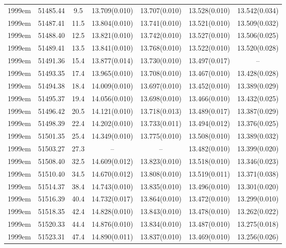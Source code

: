 \begin{table*}
\begin{tabular}{ccccccc}
1999em	  & 51485.44	 & 9.5	& 13.709(0.010)	 & 13.707(0.010)	 & 13.528(0.010)	 & 13.542(0.034) \\ 
1999em	  & 51487.41	 & 11.5	& 13.804(0.010)	 & 13.741(0.010)	 & 13.521(0.010)	 & 13.509(0.032) \\ 
1999em	  & 51488.40	 & 12.5	& 13.821(0.010)	 & 13.742(0.010)	 & 13.527(0.010)	 & 13.506(0.025) \\ 
1999em	  & 51489.41	 & 13.5	& 13.841(0.010)	 & 13.768(0.010)	 & 13.522(0.010)	 & 13.520(0.028) \\ 
1999em	  & 51491.36	 & 15.4	& 13.877(0.014)	 & 13.730(0.010)	 & 13.497(0.017)	 & -- \\ 
1999em	  & 51493.35	 & 17.4	& 13.965(0.010)	 & 13.708(0.010)	 & 13.467(0.010)	 & 13.428(0.028) \\ 
1999em	  & 51494.38	 & 18.4	& 14.009(0.010)	 & 13.697(0.010)	 & 13.452(0.010)	 & 13.389(0.029) \\ 
1999em	  & 51495.37	 & 19.4	& 14.056(0.010)	 & 13.698(0.010)	 & 13.466(0.010)	 & 13.432(0.025) \\ 
1999em	  & 51496.42	 & 20.5	& 14.121(0.010)	 & 13.718(0.013)	 & 13.489(0.017)	 & 13.387(0.029) \\ 
1999em	  & 51498.39	 & 22.4	& 14.202(0.010)	 & 13.733(0.011)	 & 13.494(0.012)	 & 13.376(0.025) \\ 
1999em	  & 51501.35	 & 25.4	& 14.349(0.010)	 & 13.775(0.010)	 & 13.508(0.010)	 & 13.389(0.032) \\ 
1999em	  & 51503.27	 & 27.3	& --	 & --	 & 13.482(0.010)	 & 13.399(0.020) \\ 
1999em	  & 51508.40	 & 32.5	& 14.609(0.012)	 & 13.823(0.010)	 & 13.518(0.010)	 & 13.346(0.023) \\ 
1999em	  & 51510.40	 & 34.5	& 14.670(0.012)	 & 13.808(0.010)	 & 13.519(0.011)	 & 13.371(0.038) \\ 
1999em	  & 51514.37	 & 38.4	& 14.743(0.010)	 & 13.835(0.010)	 & 13.496(0.010)	 & 13.301(0.020) \\ 
1999em	  & 51516.39	 & 40.4	& 14.732(0.017)	 & 13.864(0.010)	 & 13.472(0.010)	 & 13.299(0.010) \\ 
1999em	  & 51518.35	 & 42.4	& 14.828(0.010)	 & 13.843(0.010)	 & 13.478(0.010)	 & 13.262(0.022) \\ 
1999em	  & 51520.33	 & 44.4	& 14.876(0.010)	 & 13.834(0.010)	 & 13.487(0.010)	 & 13.275(0.018) \\ 
1999em	  & 51523.31	 & 47.4	& 14.890(0.011)	 & 13.837(0.010)	 & 13.469(0.010)	 & 13.256(0.026) \\ 

\end{tabular}
\end{table*}
